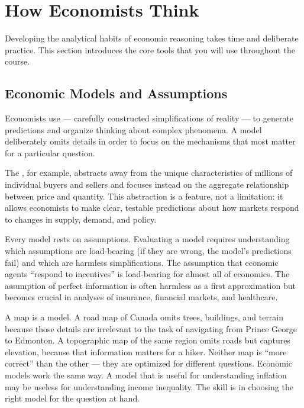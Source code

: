 \section{How Economists Think}
\label{sec:how_economists_think}

Developing the analytical habits of economic reasoning takes time and
deliberate practice. This section introduces the core tools that you will
use throughout the course.

\subsection{Economic Models and Assumptions}

Economists use  --- carefully constructed simplifications of
reality --- to generate predictions and organize thinking about complex
phenomena. A model deliberately omits details in order to focus on the
mechanisms that most matter for a particular question.

The , for example, abstracts away from the
unique characteristics of millions of individual buyers and sellers and
focuses instead on the aggregate relationship between price and quantity.
This abstraction is a feature, not a limitation: it allows economists to
make clear, testable predictions about how markets respond to changes in
supply, demand, and policy.

Every model rests on assumptions. Evaluating a model requires understanding
which assumptions are load-bearing (if they are wrong, the model's
predictions fail) and which are harmless simplifications. The assumption
that economic agents ``respond to incentives'' is load-bearing for almost
all of economics. The assumption of perfect information is often harmless
as a first approximation but becomes crucial in analyses of insurance,
financial markets, and healthcare.

\begin{thinkbox}
A map is a model. A road map of Canada omits trees, buildings, and
terrain because those details are irrelevant to the task of navigating
from Prince George to Edmonton. A topographic map of the same region
omits roads but captures elevation, because that information matters
for a hiker. Neither map is ``more correct'' than the other --- they are
optimized for different questions. Economic models work the same way.
A model that is useful for understanding inflation may be useless for
understanding income inequality. The skill is in choosing the right
model for the question at hand.
\end{thinkbox}

